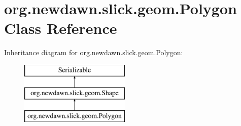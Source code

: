 \hypertarget{classorg_1_1newdawn_1_1slick_1_1geom_1_1_polygon}{}\section{org.\+newdawn.\+slick.\+geom.\+Polygon Class Reference}
\label{classorg_1_1newdawn_1_1slick_1_1geom_1_1_polygon}
Inheritance diagram for org.\+newdawn.\+slick.\+geom.\+Polygon\+:\begin{figure}[H]
\begin{center}
\leavevmode
\includegraphics[height=3.000000cm]{classorg_1_1newdawn_1_1slick_1_1geom_1_1_polygon}
\end{center}
\end{figure}
